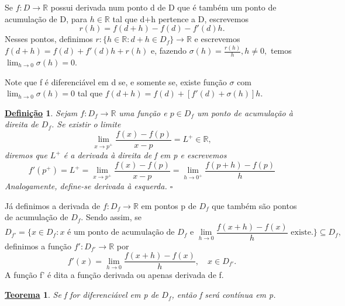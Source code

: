 \documentclass{article}
\newtheorem*{def*}{\underline{Defini\c c\~ao}}
\newtheorem*{theorem*}{\underline{Teorema}}
\begin{document}
  Se \(f:D\rightarrow \mathbb{R}\) possui derivada num ponto d de D que é também um
  ponto de acumula\c cão de D, para \(h\in \mathbb{R}\) tal que d+h pertence a D, escrevemos 
    \[
      r(h) = f(d+h)-f(d)-f'(d)h.
    \]
    Nesses pontos, definimos \(r:\{h\in \mathbb{R}: d+h\in D_{f}\}\rightarrow \mathbb{R}\)
    e escrevemos \(f(d+h) = f(d)+f'(d)h + r(h)\) e, fazendo \(\sigma (h) = \frac{r(h)}{h}, h\neq 0,\)
    temos \(\lim_{h\to 0}\sigma (h)=0.\)

    Note que f é diferenciável em d se, e somente se, existe fun\c cão \(\sigma \)
    com \(\lim_{h\to 0}\sigma (h)=0\) tal que \(f(d+h)=f(d)+[f'(d)+\sigma (h)]h\).
    \begin{def*}
      Sejam \(f:D_{f}\rightarrow \mathbb{R}\) uma fun\c cão e \(p\in D_{f}\) um ponto
      de acumula\c cão à direita de \(D_{f}\). Se existir o limite 
        \[
          \lim_{x\to p^{+}}\frac{f(x)-f(p)}{x-p}=L^+\in \mathbb{R},
        \]
        diremos que \(L^+\) é a derivada à direita de f em p e escrevemos 
          \[
            f'(p^+) = L^+=\lim_{x\to p^+}\frac{f(x)-f(p)}{x-p}= \lim_{h\to 0^{+}}\frac{f(p+h)-f(p)}{h}
          \]
          Analogamente, define-se derivada à esquerda. \(\square\)
    \end{def*}
      Já definimos a derivada de \(f:D_{f}\rightarrow \mathbb{R}\) em pontos p de
      \(D_{f}\) que também são pontos de acumula\c cão de \(D_{f}\). Sendo assim, 
      se 
        \[
          D_{f'}= \biggl\{x\in D_{f}:x\text{ é um ponto de acumula\c cão de $D_{f}$ e }\lim_{h\to 0}\frac{f(x+h)-f(x)}{h}\text{ existe.}\biggr\}\subseteq{D_{f}},
        \]
    definimos a fun\c cão \(f':D_{f'}\rightarrow \mathbb{R}\) por 
      \[
        f'(x) = \lim_{h\to 0}\frac{f(x+h)-f(x)}{h}, \quad x\in D_{f'}.
      \]
    A fun\c cão f' é dita a fun\c cão derivada ou apenas derivada de f.
    \hypertarget{diff_cont}{
     \begin{theorem*}
       Se f for diferenciável em p de \(D_{f}\), então f será contínua em p.
     \end{theorem*}
    }
\end{document}
